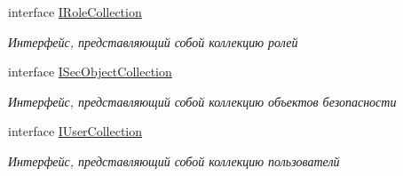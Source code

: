 \begin{DoxyCompactItemize}
interface \hyperlink{interface_security_1_1_interfaces_1_1_collections_1_1_i_role_collection}{I\+Role\+Collection}
\begin{DoxyCompactList}\small\item\em Интерфейс, представляющий собой коллекцию ролей \end{DoxyCompactList}\item 
interface \hyperlink{interface_security_1_1_interfaces_1_1_collections_1_1_i_sec_object_collection}{I\+Sec\+Object\+Collection}
\begin{DoxyCompactList}\small\item\em Интерфейс, представляющий собой коллекцию объектов безопасности \end{DoxyCompactList}\item 
interface \hyperlink{interface_security_1_1_interfaces_1_1_collections_1_1_i_user_collection}{I\+User\+Collection}
\begin{DoxyCompactList}\small\item\em Интерфейс, представляющий собой коллекцию пользователй \end{DoxyCompactList}\end{DoxyCompactItemize}

